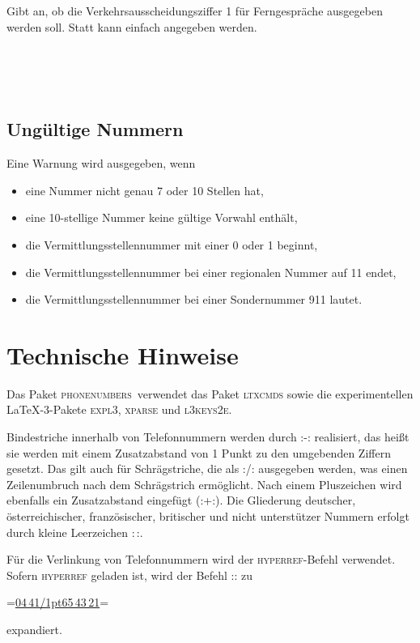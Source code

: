 \documentclass[numbers=noenddot]{scrreprt}
\newcommand*{\Paket}[1]{\textsc{#1}}
\newcommand{\phone}{\textcolor{cnltx}{\Paket{phone\-numbers}}}
\newcommand{\UeberschriftUngueltig}{\section{Ungültige Nummern}}
\newcommand{\WarnungWenn}{Eine Warnung wird ausgegeben, wenn}
\begin{document}
\begin{Befehlsliste}
Gibt an, ob die Verkehrsausscheidungsziffer 1 für Ferngespräche ausgegeben werden soll. Statt  kann einfach  angegeben werden.
\begin{sidebyside}
   \\
   \\
   \\
\end{sidebyside}
\end{Befehlsliste}

\newpage
\UeberschriftUngueltig
\WarnungWenn
\begin{itemize}
\item eine Nummer nicht genau 7 oder 10 Stellen hat,
\item eine 10-stellige Nummer keine gültige Vorwahl enthält,
\item die Vermittlungsstellennummer mit einer 0 oder 1 beginnt,
\item die Vermittlungsstellennummer bei einer regionalen Nummer auf 11 endet,
\item die Vermittlungsstellennummer bei einer Sondernummer 911 lautet.
\end{itemize}

\chapter{Technische Hinweise}
Das Paket \phone\ verwendet das Paket
\Paket{ltxcmds} 
sowie die experimentellen \LaTeX-3-Pakete
\Paket{expl3}, \Paket{xparse} und \Paket{l3keys2e}.

Bindestriche innerhalb von Telefonnummern werden durch
\verbcode:\kern1pt-\kern1pt: realisiert, das heißt sie werden mit einem Zusatzabstand von 1 Punkt zu den umgebenden Ziffern gesetzt. Das gilt auch für Schrägstriche, die als
\verbcode:\kern1pt\slash\kern1pt: ausgegeben werden, was einen Zeilenumbruch nach dem Schrägstrich ermöglicht. Nach einem Pluszeichen wird ebenfalls ein Zusatzabstand eingefügt
(\verbcode:+\kern1pt:).
Die Gliederung deutscher, österreichischer, französischer, britischer und nicht unterstützer Nummern erfolgt durch kleine Leerzeichen
\verbcode:\,:.

Für die Verlinkung von Telefonnummern wird der \Paket{hyperref}-Befehl  verwendet. Sofern \Paket{hyperref} geladen ist, wird der Befehl
\verbcode::
zu
\begin{center}
\verbcode=\href{tel:+49441654321}{04\,41\kern1pt\slash\kern1pt65\,43\,21}=
\end{center}
expandiert.
\end{document}
